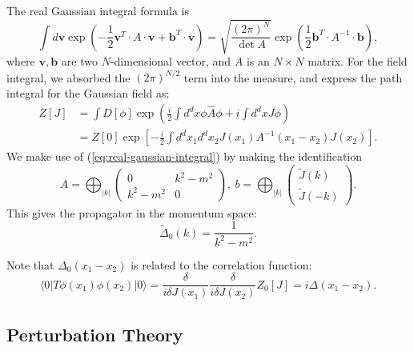 \begin{framedrmk}
The real Gaussian integral formula is
\begin{equation}
	\int d\bm v \exp\left(-\frac{1}{2}\bm{v}^T \cdot A\cdot \bm{v} + \bm{b}^T \cdot \bm{v}\right) 
	= \sqrt{\frac{(2\pi)^N}{\det{A}}}\exp\left(\frac{1}{2}\bm{b}^T \cdot A^{-1} \cdot \bm{b}\right),
	\label{eq:real-gaussian-integral}
\end{equation}
where $\bm v, \bm b$ are two $N$-dimensional vector, and $A$ is an $N\times N$ matrix.
For the field integral, we absorbed the $(2\pi)^{N/2}$ term into the measure, and express the path integral for the Gaussian field as:
\begin{equation*}
\begin{aligned}
	Z[J] &= \int D[\phi] \exp\left(\frac{i}{2}\int d^dx \phi \hat{A} \phi +i \int d^d xJ \phi\right) \\
	&= Z[0] \exp\left[-\frac{i}{2}\int d^d x_1 d^d x_2 J(x_1) A^{-1}(x_1-x_2) J(x_2)\right].
\end{aligned}
\end{equation*}
We make use of (\ref{eq:real-gaussian-integral}) by making the identification 
\begin{equation*}
	A = \bigoplus_{|k|} \left(
	\begin{array}{cc} 
		0 & k^2-m^2 \\ 
		k^2-m^2 & 0 
	\end{array}\right),\ 
	b = \bigoplus_{|k|} \left(
	\begin{array}{c}
		\tilde{J}(k) \\ 
		\tilde{J}(-k) 
	\end{array}\right).
\end{equation*}
This gives the propagator in the momentum space:
\begin{equation*}
	\tilde{\Delta}_0(k) = \frac{1}{k^2-m^2}.
\end{equation*}
\end{framedrmk}

Note that $\Delta_0(x_1-x_2)$ is related to the correlation function:
\begin{equation*}
	\langle 0| T\phi(x_1)\phi(x_2)|0\rangle
	= \frac{\delta}{i\delta J(x_1)}\frac{\delta}{i\delta J(x_2)} Z_0[J] 
	= i\Delta(x_1-x_2).
\end{equation*}



\subsection{Perturbation Theory}

